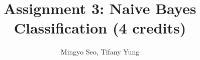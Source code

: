 \documentclass[10pt,letterpaper]{article}
\begin{document}
\setlength{\parskip}{1em}

\title{Assignment 3: Naive Bayes Classification (4 credits)}
\author{Mingyo Seo, Tifany Yung}
\maketitle




\end{document}
